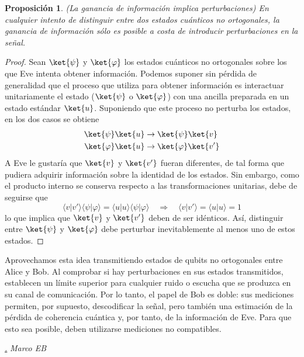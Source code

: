 \documentclass[a4paper,11pt]{book} %
\newtheorem{proposicion_contador}{Proposición}
\newcommand{\Proposicion}[1]{
		\begin{mybox_gray2}{}
			\begin{proposicion_contador}
				 #1 
			\end{proposicion_contador} 
		\end{mybox_gray2}
	}
\numberwithin{equation}{chapter}
\newcommand{\braket}[2]{\langle #1|#2\rangle}
\def\rqa{\quad \Rightarrow \quad}
\def\subsubiContadorIt{\par\addtocounter{subsubsection}{1}\underline{\it\thesubsubsection.}\hskip0.5cm \setcounter{subsubsubsectionIt}{0}}
\newcommand{\SubsubiIt}[1]{
		\subsubiContadorIt \textit{#1}
	}
\newcounter{subsubsubsectionIt}[subsubsection]
\begin{document}
	\Proposicion{
	\textit{(La ganancia de información implica perturbaciones)} En cualquier intento de distinguir entre dos estados cuánticos no ortogonales, la ganancia de información sólo es posible a costa de introducir perturbaciones en la señal.
	}

	\begin{proof}
	Sean $\ket{\psi}$ y $\ket{\varphi}$ los estados cuánticos no ortogonales sobre los que Eve intenta obtener información. Podemos suponer sin pérdida de generalidad que el proceso que utiliza para obtener información es interactuar unitariamente el estado ($\ket{\psi}$ o $\ket{\varphi}$) con una ancilla preparada en un estado estándar $\ket{u}$. Suponiendo que este proceso no perturba los estados, en los dos casos se obtiene
	\begin{align}
	\ket{\psi} \ket{u} & \rightarrow \ket{\psi} \ket{v} \\
	\ket{\varphi} \ket{u} & \rightarrow \ket{\varphi} \ket{v'}
	\end{align}
	A Eve le gustaría que $\ket{v}$ y $\ket{v'}$ fueran diferentes, de tal forma que pudiera adquirir información sobre la identidad de los estados. Sin embargo, como el producto interno se conserva respecto a las transformaciones unitarias, debe de seguirse que
	\begin{equation}
	\braket{v}{v'} \braket{\psi}{\varphi} = \braket{u}{u} \braket{\psi}{\varphi} \rqa \braket{v}{v'} = \braket{u}{u} = 1	
	\end{equation}
	lo que implica que $\ket{v}$ y $\ket{v'}$ deben de ser idénticos. Así, distinguir entre $\ket{\psi}$ y $\ket{\varphi}$ debe perturbar inevitablemente al menos uno de estos estados.
	\end{proof}
Aprovechamos esta idea transmitiendo estados de qubits no ortogonales entre Alice y Bob. Al comprobar si hay perturbaciones en sus estados transmitidos, establecen un límite superior para cualquier ruido o escucha que se produzca en su canal de comunicación. Por lo tanto, el papel de Bob es doble: sus mediciones permiten, por supuesto, descodificar la señal, pero también una estimación de la pérdida de coherencia cuántica y, por tanto, de la información de Eve. Para que esto sea posible, deben utilizarse mediciones no compatibles.

			\SubsubiIt{Marco EB}
\end{document}
